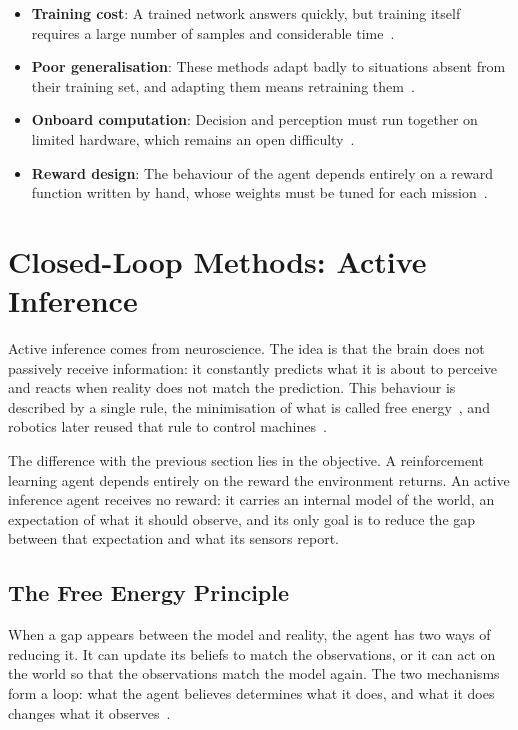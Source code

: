\begin{itemize}[itemsep=0.5em]
    \item \textbf{Training cost}: A trained network answers quickly, but training
          itself requires a large number of samples and considerable
          time~\cite{krayani2026bayesian}.
    \item \textbf{Poor generalisation}: These methods adapt badly to situations
          absent from their training set, and adapting them means retraining
          them~\cite{krayani2023goal, krayani2026bayesian}.
    \item \textbf{Onboard computation}: Decision and perception must run together
          on limited hardware, which remains an open
          difficulty~\cite{sandino2020autonomous}.
    \item \textbf{Reward design}: The behaviour of the agent depends entirely on
          a reward function written by hand, whose weights must be tuned for each
          mission~\cite{ding2024external}.
\end{itemize}    
\section{Closed-Loop Methods: Active Inference}%
\label{sec:nav:activeinf}

Active inference comes from neuroscience. The idea is that the brain does not
passively receive information: it constantly predicts what it is about to
perceive and reacts when reality does not match the prediction. This behaviour is
described by a single rule, the minimisation of what is called free
energy~\cite{ding2024external}, and robotics later reused that rule to control
machines~\cite{ji2023delay}.

The difference with the previous section lies in the objective. A reinforcement
learning agent depends entirely on the reward the environment returns. An active
inference agent receives no reward: it carries an internal model of the world, an
expectation of what it should observe, and its only goal is to reduce the gap
between that expectation and what its sensors report.

\subsection{The Free Energy Principle}%
\label{subsec:nav:fep}

When a gap appears between the model and reality, the agent has two ways of
reducing it. It can update its beliefs to match the observations, or it can act
on the world so that the observations match the model again. The two mechanisms
form a loop: what the agent believes determines what it does, and what it does
changes what it observes~\cite{ji2024integration}.

